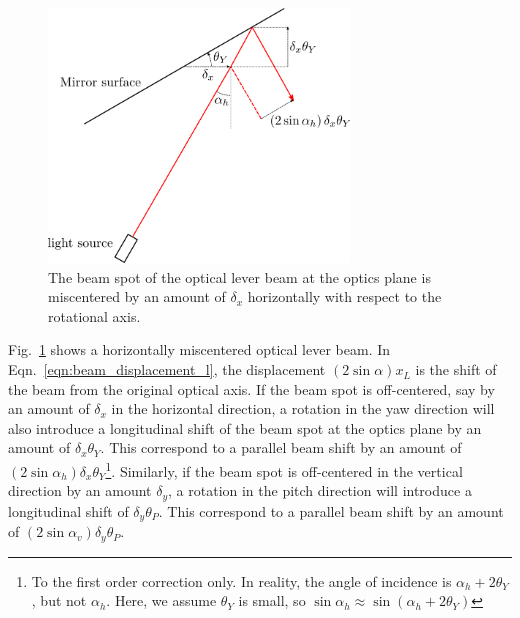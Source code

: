 \begin{figure}[!h]
	\centering
	\includegraphics[width=80mm]{figures/miscentered}
	\caption{The beam spot of the optical lever beam at the optics plane is miscentered by an amount of $\delta_x$ horizontally with respect to the rotational axis.}
	\label{fig:miscentered}
\end{figure}
Fig.~\ref{fig:miscentered} shows a horizontally miscentered optical lever beam.
In Eqn.~\eqref{eqn:beam_displacement_l}, the displacement $\left(2\sin\alpha\right)x_L$ is the shift of the beam from the original optical axis.
If the beam spot is off-centered, say by an amount of $\delta_x$ in the horizontal direction, a rotation in the yaw direction will also introduce a longitudinal shift of the beam spot at the optics plane by an amount of $\delta_x\theta_Y$. 
This correspond to a parallel beam shift by an amount of $\left(2\sin\alpha_h\right)\delta_x\theta_Y$\footnote{To the first order correction only. In reality, the angle of incidence is $\alpha_h+2\theta_Y$, but not $\alpha_h$. Here, we assume $\theta_Y$ is small, so $\sin\alpha_h \approx \sin{\left(\alpha_h+2\theta_Y\right)}$}.
Similarly, if the beam spot is off-centered in the vertical direction by an amount $\delta_y$, a rotation in the pitch direction will introduce a longitudinal shift of $\delta_y\theta_P$.
This correspond to a parallel beam shift by an amount of $\left(2\sin\alpha_v\right)\delta_y\theta_P$.

